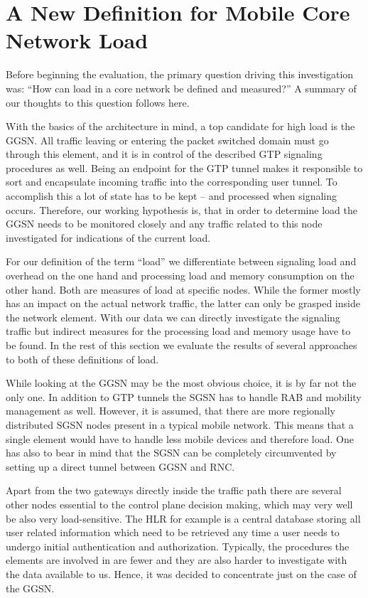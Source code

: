 \section{A New Definition for Mobile Core Network Load}
\label{c4:loaddefinition}

Before beginning the evaluation, the primary question driving this investigation was: ``How can load in a core network be defined and measured?'' A summary of our thoughts to this question follows here.

With the basics of the architecture in mind, a top candidate for high load is the \gls{GGSN}. All traffic leaving or entering the packet switched domain must go through this element, and it is in control of the described GTP signaling procedures as well. Being an endpoint for the GTP tunnel makes it responsible to sort and encapsulate incoming traffic into the corresponding user tunnel. To accomplish this a lot of state has to be kept -- and processed when signaling occurs. Therefore, our working hypothesis is, that in order to determine load the \gls{GGSN} needs to be monitored closely and any traffic related to this node investigated for indications of the current load.

For our definition of the term ``load'' we differentiate between signaling load and overhead on the one hand and processing load and memory consumption on the other hand. Both are measures of load at specific nodes. While the former mostly has an impact on the actual network traffic, the latter can only be grasped inside the network element. With our data we can directly investigate the signaling traffic but indirect measures for the processing load and memory usage have to be found. In the rest of this section we evaluate the results of several approaches to both of these definitions of load.

While looking at the \gls{GGSN} may be the most obvious choice, it is by far not the only one. 
In addition to GTP tunnels the \gls{SGSN} has to handle \gls{RAB} and mobility management as well. However, it is assumed, that there are more regionally distributed \gls{SGSN} nodes present in a typical mobile network. This means that a single element would have to handle less mobile devices and therefore load. One has also to bear in mind that the \gls{SGSN} can be completely circumvented by setting up a direct tunnel between \gls{GGSN} and \gls{RNC}.

Apart from the two gateways directly inside the traffic path there are several other nodes essential to the control plane decision making, which may very well be also very load-sensitive. The \gls{HLR} for example is a central database storing all user related information which need to be retrieved any time a user needs to undergo initial authentication and authorization. Typically, the procedures the elements are involved in are fewer and they are also harder to investigate with the data available to us. Hence, it was decided to concentrate just on the case of the \gls{GGSN}.


